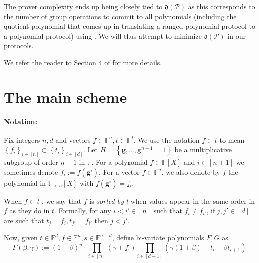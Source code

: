 \documentclass[11pt]{article} %
\newcommand{\F}{\ensuremath{\mathbb F}\xspace}
\newcommand{\defeq}{:=}
\newcommand{\dom}{\ensuremath{H}\xspace}
\newcommand{\sett}[2]{\ensuremath{\set{#1}_{#2}}\xspace}
\newcommand{\set}[1]{\ensuremath{\left\{#1\right\}}\xspace}
\newcommand{\hgen}{\ensuremath{\mathbf{g}}\xspace}
\newcommand{\cosetgen}{\ensuremath{\mathbf{\kappa}}\xspace}
\newcommand{\polysofdeg}[1]{\ensuremath{\F_{< #1}[X]}\xspace}
\newcommand{\polyss}{\ensuremath{\F[X]}\xspace}
\newcommand{\prot}{\ensuremath{\mathscr{P}}\xspace}
\newcommand{\aggdeg}[1]{\ensuremath{\mathfrak{d}(#1)}\xspace}
\begin{document}
The prover complexity ends up being closely tied to \aggdeg{\prot} as this corresponds to the number of group operations to commit to all polynomials (including the quotient polynomial that comes up in translating a ranged polynomial protocol to a polynomial protocol) using \cite{kate}. We will thus attempt to minimize \aggdeg{\prot} in our protocols.


We refer the reader to Section 4 of \cite{plonk} for more details.
 

\section{The main scheme}\label{sec:mainscheme}


\paragraph{Notation:}

Fix integers $n,d$ and vectors $f\in \F^n, t\in\F^d$.
We use the notation $f\subset t$ to mean $\sett{f_i}{i\in [n]}\subset \sett{t_i}{i\in [d]}$. Let $\dom=\set{\hgen,\ldots,\hgen^{n+1}=1}$ be a multiplicative subgroup of order $n+1$ in \F.
For a polynomial $f\in \polyss$ and $i\in [n+1]$ we sometimes denote $f_i\defeq f(\hgen^i)$.
For a vector $f\in \F^n$, we also denote by $f$ the polynomial in \polysofdeg{n} with $f(\hgen^i) =f_i$.


When $f\subset t$ , we say that $f$ is \emph{sorted by $t$} when values appear in the same order in $f$ as they do in $t$. Formally, for any $i<i'\in [n]$ such that $f_i\neq f_{i'}$, if $j,j'\in [d]$ are such that $t_{j} = f_i, t_{j'} =f_{i'}$ then $j<j'$.

Now, given $t\in \F^d, f\in \F^n, s\in \F^{n+d}$, define bi-variate polynomials $F,G$ as 
\[F(\beta,\gamma) \defeq (1+\beta)^n\cdot \prod_{i\in [n]} (\gamma + f_i) \prod_{i\in [d-1]} (\gamma(1+\beta) + t_i + \beta t_{i+1})\]
                                  
\end{document}
